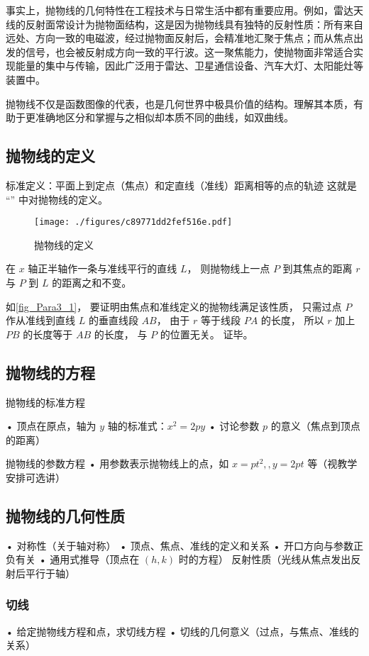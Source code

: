 事实上，抛物线的几何特性在工程技术与日常生活中都有重要应用。例如，雷达天线的反射面常设计为抛物面结构，这是因为抛物线具有独特的反射性质：所有来自远处、方向一致的电磁波，经过抛物面反射后，会精准地汇聚于焦点；而从焦点出发的信号，也会被反射成方向一致的平行波。这一聚焦能力，使抛物面非常适合实现能量的集中与传输，因此广泛用于雷达、卫星通信设备、汽车大灯、太阳能灶等装置中。

抛物线不仅是函数图像的代表，也是几何世界中极具价值的结构。理解其本质，有助于更准确地区分和掌握与之相似却本质不同的曲线，如双曲线。


\subsection{抛物线的定义}
标准定义：平面上到定点（焦点）和定直线（准线）距离相等的点的轨迹
这就是 “” 中对抛物线的定义。
\begin{figure}[ht]
\centering
\texttt{[image: ./figures/c89771dd2fef516e.pdf]}
\caption{抛物线的定义} \label{fig_Para3_1}
\end{figure}

在 $x$ 轴正半轴作一条与准线平行的直线 $L$， 则抛物线上一点 $P$ 到其焦点的距离 $r$ 与 $P$ 到 $L$ 的距离之和不变。

如\autoref{fig_Para3_1}， 要证明由焦点和准线定义的抛物线满足该性质， 只需过点 $P$ 作从准线到直线 $L$ 的垂直线段 $AB$， 由于 $r$ 等于线段 $PA$ 的长度， 所以 $r$ 加上 $PB$ 的长度等于 $AB$ 的长度， 与 $P$ 的位置无关。 证毕。


\subsection{抛物线的方程}
\begin{theorem}{抛物线的标准方程}

\end{theorem}
	•	顶点在原点，轴为 $y$ 轴的标准式：$x^2=2py$
	•	讨论参数 $p$ 的意义（焦点到顶点的距离）
\begin{theorem}{抛物线的参数方程}
	•	用参数表示抛物线上的点，如 $x=pt^2,,y=2pt$ 等（视教学安排可选讲）
\end{theorem}

\subsection{抛物线的几何性质}
	•	对称性（关于轴对称）
	•	顶点、焦点、准线的定义和关系
	•	开口方向与参数正负有关
	•	通用式推导（顶点在 $(h,k)$ 时的方程）
    反射性质（光线从焦点发出反射后平行于轴）
\subsubsection{切线}
	•	给定抛物线方程和点，求切线方程
	•	切线的几何意义（过点，与焦点、准线的关系）
